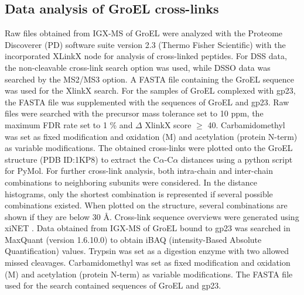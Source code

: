 \subsection*{Data analysis of GroEL cross-links}
Raw files obtained from IGX-MS of GroEL were analyzed with the Proteome Discoverer (PD) software suite version 2.3 (Thermo Fisher Scientific) with the incorporated XLinkX node for analysis of cross-linked peptides. For DSS data, the non-cleavable cross-link search option was used, while DSSO data was searched by the MS2/MS3 option. A FASTA file containing the GroEL sequence was used for the XlinkX search. For the samples of GroEL complexed with gp23, the FASTA file was supplemented with the sequences of GroEL and gp23. Raw files were searched with the precursor mass tolerance set to 10 ppm, the maximum FDR rate set to 1 \% and $\Delta$ XlinkX score $\geq$ 40. Carbamidomethyl was set as fixed modification and oxidation (M) and acetylation (protein N-term) as variable modifications. The obtained cross-links were plotted onto the GroEL structure (PDB ID:1KP8) to extract the C$\alpha$-C$\alpha$ distances using a python script for PyMol. For further cross-link analysis, both intra-chain and inter-chain combinations to neighboring subunits were considered. In the distance histograms, only the shortest combination is represented if several possible combinations existed. When plotted on the structure, several combinations are shown if they are below 30 Å. Cross-link sequence overviews were generated using xiNET \cite{Combe_2015}. Data obtained from IGX-MS of GroEL bound to gp23 was searched in MaxQuant (version 1.6.10.0) to obtain iBAQ (intensity-Based Absolute Quantification) values. Trypsin was set as a digestion enzyme with two allowed missed cleavages. Carbamidomethyl was set as fixed modification and oxidation (M) and acetylation (protein N-term) as variable modifications. The FASTA file used for the search contained sequences of GroEL and gp23.
%
